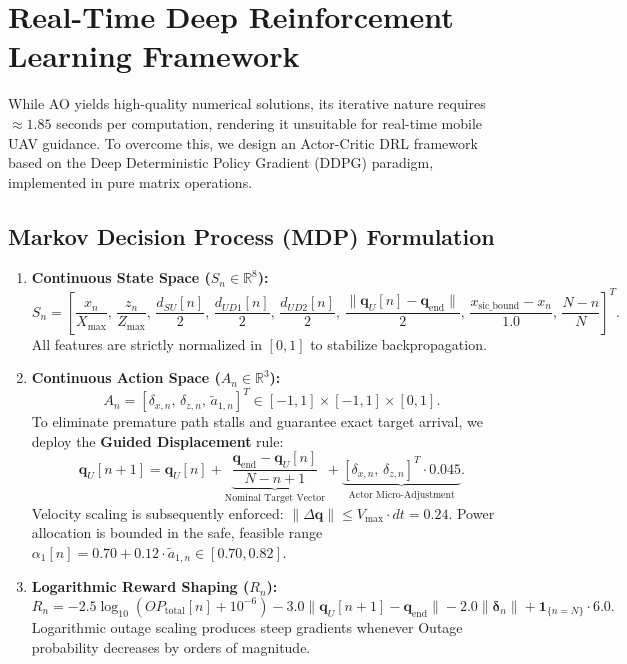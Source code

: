 \section{Real-Time Deep Reinforcement Learning Framework}
\label{sec:drl}

While AO yields high-quality numerical solutions, its iterative nature requires $\approx 1.85$ seconds per computation, rendering it unsuitable for real-time mobile UAV guidance. To overcome this, we design an Actor-Critic DRL framework based on the Deep Deterministic Policy Gradient (DDPG) paradigm, implemented in pure matrix operations.

\subsection{Markov Decision Process (MDP) Formulation}
\begin{enumerate}
    \item \textbf{Continuous State Space ($S_n \in \mathbb{R}^8$):}
    \begin{equation}
        S_n = \left[ \frac{x_n}{X_{\max}}, \, \frac{z_n}{Z_{\max}}, \, \frac{d_{SU}[n]}{2}, \, \frac{d_{UD1}[n]}{2}, \, \frac{d_{UD2}[n]}{2}, \, \frac{\|\mathbf{q}_U[n] - \mathbf{q}_{\text{end}}\|}{2}, \, \frac{x_{\text{sic\_bound}} - x_n}{1.0}, \, \frac{N - n}{N} \right]^T.
    \end{equation}
    All features are strictly normalized in $[0, 1]$ to stabilize backpropagation.
    \item \textbf{Continuous Action Space ($A_n \in \mathbb{R}^3$):}
    \begin{equation}
        A_n = [\delta_{x, n}, \, \delta_{z, n}, \, \tilde{a}_{1, n}]^T \in [-1, 1] \times [-1, 1] \times [0, 1].
    \end{equation}
    To eliminate premature path stalls and guarantee exact target arrival, we deploy the \textbf{Guided Displacement} rule:
    \begin{equation}
        \mathbf{q}_U[n+1] = \mathbf{q}_U[n] + \underbrace{\frac{\mathbf{q}_{\text{end}} - \mathbf{q}_U[n]}{N - n + 1}}_{\text{Nominal Target Vector}} + \underbrace{[\delta_{x, n}, \, \delta_{z, n}]^T \cdot 0.045}_{\text{Actor Micro-Adjustment}}.
    \end{equation}
    Velocity scaling is subsequently enforced: $\|\Delta \mathbf{q}\| \le V_{\max} \cdot dt = 0.24$.
    Power allocation is bounded in the safe, feasible range $\alpha_1[n] = 0.70 + 0.12 \cdot \tilde{a}_{1, n} \in [0.70, 0.82]$.
    \item \textbf{Logarithmic Reward Shaping ($R_n$):}
    \begin{equation}
        R_n = - 2.5 \log_{10}(OP_{\text{total}}[n] + 10^{-6}) - 3.0 \|\mathbf{q}_U[n+1] - \mathbf{q}_{\text{end}}\| - 2.0 \|\boldsymbol{\delta}_n\| + \mathbf{1}_{\{n = N\}} \cdot 6.0.
    \end{equation}
    Logarithmic outage scaling produces steep gradients whenever Outage probability decreases by orders of magnitude.
\end{enumerate}

